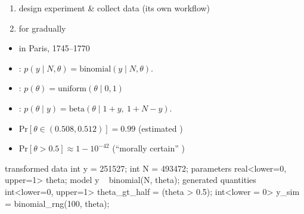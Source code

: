 \documentclass[9pt]{report}
\begin{document}
\begin{enumerate}
\item design experiment \& collect data (its own workflow)
\item for gradually 
\end{enumerate}




\begin{itemize}
\item {} in Paris, 1745--1770
\item {}:
$p(y \mid N, \theta)
 = \textrm{binomial}(y \mid N, \theta).$
\item {}:
$p(\theta)
 = \textrm{uniform}(\theta \mid 0, 1)$
\item {}:
$p(\theta \mid y)
 = \textrm{beta}(\theta \mid 1 + y, \ 1 + N - y).$
\vfill
\item {$\textrm{Pr}[\theta \in (0.508, 0.512)] = 0.99$}
\hfill {\small (estimated )}
\item {$\textrm{Pr}[\theta > 0.5] \approx 1 - 10^{-42}$}
\hfill {\small (``morally certain'' )}
\end{itemize}

\begin{stancode}
transformed data {
  int y = 251527;  int N = 493472;
}
parameters {
  real<lower=0, upper=1> theta;
}
model {
  y ~ binomial(N, theta);
}
generated quantities {
  int<lower=0, upper=1> theta_gt_half = (theta > 0.5);
  int<lower = 0> y_sim = binomial_rng(100, theta);
}
\end{stancode}
\end{document}
